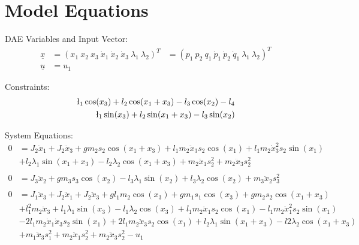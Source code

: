 \documentclass[10pt,a4paper]{article}
\begin{document}
	
	\begin{tabular}{ll}

	\end{tabular}
	
	
	\section{Model Equations} %
	
	DAE Variables and Input Vector:
	\begin{align*}
		\underline{x} &= (x_1 \ x_2 \ x_3 \ \dot{x}_1 \ \dot{x}_2 \ \dot{x}_3 \ \lambda_1 \ \lambda_2)^T &= (p_1 \ p_2 \ q_1 \ \dot{p}_1 \ \dot{p}_2 \ \dot{q}_1 \ \lambda_1 \ \lambda_2)^T \\
		\underline{u} &= u_1
	\end{align*}
	
	\noindent Constraints:			
	\begin{subequations}
	\begin{align}
		\l_1\cos(x_3) + l_2\cos(x_1 + x_3) - l_3\cos(x_2) - l_4 \\
		\l_1\sin(x_3) + l_2\sin(x_1 + x_3) - l_3\sin(x_2)
	\end{align}
	\end{subequations}
	
	\noindent System Equations:			
	\begin{subequations}
	\begin{align*}
	0 &= J_2\ddot{x}_1 + J_2\ddot{x}_3 + g m_2 s_2\cos(x_1 + x_3) + l_1 m_2 \ddot{x}_3 s_2 \cos(x_1) + l_1 m_2 \dot{x}_3^2 s_2 \sin(x_1) \\
	&+ l_2 \lambda_1 \sin(x_1 + x_3) - l_2 \lambda_2 \cos(x_1 + x_3) + m_2 \ddot{x}_1 s_2^2 + m_2 \ddot{x}_3 s_2^2 \\ 
	\\
	0 &= J_3 \ddot{x}_2 + g m_3 s_3 \cos(x_2) - l_3 \lambda_1 \sin(x_2) + l_3 \lambda_2 \cos(x_2) + m_3 \ddot{x}_2 s_3^2 \\
	\\
	0 &= J_1 \ddot{x}_3 + J_2 \ddot{x}_1 + J_2 \ddot{x}_3 + g l_1 m_2 \cos(x_3) + g m_1 s_1 \cos(x_3) + g m_2 s_2 \cos(x_1 + x_3) \\
	&+ l_1^2 m_2 \ddot{x}_3 + l_1 \lambda_1 \sin(x_3) - l_1 \lambda_2 \cos(x_3) + l_1 m_2 \ddot{x}_1 s_2 \cos(x_1)- l_1 m_2 \dot{x}_1^2 s_2 \sin(x_1) \\
	&- 2 l_1 m_2 \dot{x}_1 \dot{x}_3 s_2 \sin(x_1) + 2 l_1 m_2 \ddot{x}_3 s_2 \cos(x_1)+ l_2 \lambda_1 \sin(x_1 + x_3) - l2 \lambda_2 \cos(x_1 + x_3) \\
	&+ m_1 \ddot{x}_3 s_1^2 + m_2 \ddot{x}_1 s_2^2 + m_2 \ddot{x}_3 s_2^2 - u_1 \\
	\end{align*}       
	\end{subequations}
\end{document}
